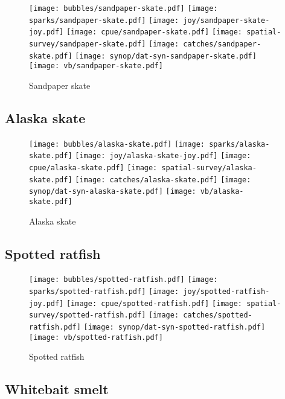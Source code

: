 \begin{figure}[htbp]
\centering
\texttt{[image: bubbles/sandpaper-skate.pdf]}
\texttt{[image: sparks/sandpaper-skate.pdf]}
\texttt{[image: joy/sandpaper-skate-joy.pdf]}
\texttt{[image: cpue/sandpaper-skate.pdf]}
\texttt{[image: spatial-survey/sandpaper-skate.pdf]}
\texttt{[image: catches/sandpaper-skate.pdf]}
\texttt{[image: synop/dat-syn-sandpaper-skate.pdf]}
\texttt{[image: vb/sandpaper-skate.pdf]}
\caption{Sandpaper skate}
\end{figure}
\clearpage
\subsection*{Alaska skate}

\begin{figure}[htbp]
\centering
\texttt{[image: bubbles/alaska-skate.pdf]}
\texttt{[image: sparks/alaska-skate.pdf]}
\texttt{[image: joy/alaska-skate-joy.pdf]}
\texttt{[image: cpue/alaska-skate.pdf]}
\texttt{[image: spatial-survey/alaska-skate.pdf]}
\texttt{[image: catches/alaska-skate.pdf]}
\texttt{[image: synop/dat-syn-alaska-skate.pdf]}
\texttt{[image: vb/alaska-skate.pdf]}
\caption{Alaska skate}
\end{figure}
\clearpage
\subsection*{Spotted ratfish}

\begin{figure}[htbp]
\centering
\texttt{[image: bubbles/spotted-ratfish.pdf]}
\texttt{[image: sparks/spotted-ratfish.pdf]}
\texttt{[image: joy/spotted-ratfish-joy.pdf]}
\texttt{[image: cpue/spotted-ratfish.pdf]}
\texttt{[image: spatial-survey/spotted-ratfish.pdf]}
\texttt{[image: catches/spotted-ratfish.pdf]}
\texttt{[image: synop/dat-syn-spotted-ratfish.pdf]}
\texttt{[image: vb/spotted-ratfish.pdf]}
\caption{Spotted ratfish}
\end{figure}
\clearpage
\subsection*{Whitebait smelt}

